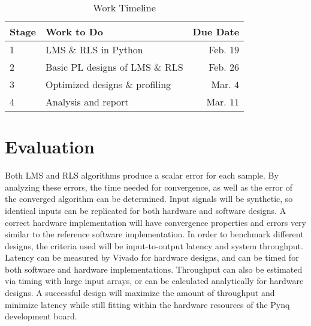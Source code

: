 \documentclass[12pt, letter, twocolumn]{article}
\begin{document}
\begin{table}[h]
	\centering
	\caption{Work Timeline}
	\label{tab:stages}
	\begin{adjustbox}{width=0.5\textwidth}
	\begin{tabular}{llr}
	\toprule
	Stage & Work to Do & Due Date \\
	\midrule
	1 & \ac{LMS} \& \ac{RLS} in Python & Feb. $19$ \\
	2 & Basic PL designs of \ac{LMS} \& \ac{RLS} & Feb. $26$ \\
	3 & Optimized designs \& profiling & Mar. $4$ \\
	4 & Analysis and report & Mar. $11$ \\
	\end{tabular}
	\end{adjustbox}
\end{table}

\section*{Evaluation}
Both \ac{LMS} and \ac{RLS} algorithms produce a scalar error for each sample. By analyzing these errors, the time needed for convergence, as well as the error of the converged algorithm can be determined. Input signals will be synthetic, so identical inputs can be replicated for both hardware and software designs. A correct hardware implementation will have convergence properties and errors very similar to the reference software implementation. In order to benchmark different designs, the criteria used will be input-to-output latency and system throughput. Latency can be measured by Vivado for hardware designs, and can be timed for both software and hardware implementations. Throughput can also be estimated via timing with large input arrays, or can be calculated analytically for hardware designs. A successful design will maximize the amount of throughput and minimize latency while still fitting within the hardware resources of the Pynq development board.




\end{document}
